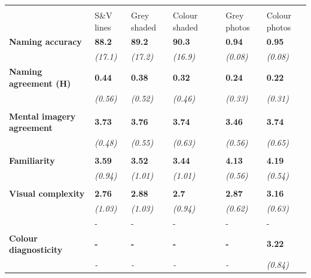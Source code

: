 \documentclass[
  11pt,
]{article}
\begin{document}
\begin{table}[!h]
\centering
\begin{tabular}{>{\raggedright\arraybackslash}p{13em}>{\centering\arraybackslash}p{3.8em}>{\centering\arraybackslash}p{3.8em}>{\centering\arraybackslash}p{3.8em}>{\centering\arraybackslash}p{2em}>{\centering\arraybackslash}p{3.8em}>{\centering\arraybackslash}p{3.8em}}
\toprule
\multicolumn{1}{c}{ } & \multicolumn{3}{c}{Rossion \& Pourtois (2004)} & \multicolumn{1}{c}{ } & \multicolumn{2}{c}{Current study} \\
\cmidrule(l{3pt}r{3pt}){2-4} \cmidrule(l{3pt}r{3pt}){6-7}
  & S\&V lines & Grey shaded & Colour shaded &    & Grey photos & Colour photos\\
\midrule
\textbf{Naming accuracy} & \textbf{88.2} & \textbf{89.2} & \textbf{90.3} & \textbf{} & \textbf{0.94} & \textbf{0.95}\\
\em{} & \em{(17.1)} & \em{(17.2)} & \em{(16.9)} & \em{} & \em{(0.08)} & \em{(0.08)}\\
\textbf{Naming agreement (H)} & \textbf{0.44} & \textbf{0.38} & \textbf{0.32} & \textbf{} & \textbf{0.24} & \textbf{0.22}\\
\em{} & \em{(0.56)} & \em{(0.52)} & \em{(0.46)} & \em{} & \em{(0.33)} & \em{(0.31)}\\
 &  &  &  &  &  \vphantom{2} & \\
\addlinespace
\textbf{Mental imagery agreement} & \textbf{3.73} & \textbf{3.76} & \textbf{3.74} & \textbf{} & \textbf{3.46} & \textbf{3.74}\\
\em{} & \em{(0.48)} & \em{(0.55)} & \em{(0.63)} & \em{} & \em{(0.56)} & \em{(0.65)}\\
 &  &  &  &  &  \vphantom{1} & \\
\textbf{Familiarity} & \textbf{3.59} & \textbf{3.52} & \textbf{3.44} & \textbf{} & \textbf{4.13} & \textbf{4.19}\\
\em{} & \em{(0.94)} & \em{(1.01)} & \em{(1.01)} & \em{} & \em{(0.56)} & \em{(0.54)}\\
\addlinespace
 &  &  &  &  &  & \\
\textbf{Visual complexity} & \textbf{2.76} & \textbf{2.88} & \textbf{2.7} & \textbf{} & \textbf{2.87} & \textbf{3.16}\\
\em{} & \em{(1.03)} & \em{(1.03)} & \em{(0.94)} & \em{} & \em{(0.62)} & \em{(0.63)}\\
 & - & - & - &  & - & -\\
\textbf{Colour diagnosticity} & \textbf{-} & \textbf{-} & \textbf{-} & \textbf{} & \textbf{-} & \textbf{3.22}\\
\addlinespace
\em{} & \em{-} & \em{-} & \em{-} & \em{} & \em{-} & \em{(0.84)}\\
\bottomrule
\end{tabular}
\end{table}
\end{document}
